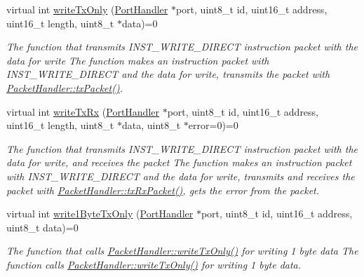 \begin{DoxyCompactItemize}
virtual int \hyperlink{classmercury_1_1_packet_handler_acf4e01987186250221603f794e7e4b59}{write\+Tx\+Only} (\hyperlink{classmercury_1_1_port_handler}{Port\+Handler} $\ast$port, uint8\+\_\+t id, uint16\+\_\+t address, uint16\+\_\+t length, uint8\+\_\+t $\ast$data)=0
\begin{DoxyCompactList}\small\item\em The function that transmits I\+N\+S\+T\+\_\+\+W\+R\+I\+T\+E\+\_\+\+D\+I\+R\+E\+CT instruction packet with the data for write  The function makes an instruction packet with I\+N\+S\+T\+\_\+\+W\+R\+I\+T\+E\+\_\+\+D\+I\+R\+E\+CT and the data for write,  transmits the packet with \hyperlink{classmercury_1_1_packet_handler_acc3f84f0d952dc2d827d8500de512abe}{Packet\+Handler\+::tx\+Packet()}. \end{DoxyCompactList}\item 
virtual int \hyperlink{classmercury_1_1_packet_handler_adf35a5000d465bd5426530e34a91a21d}{write\+Tx\+Rx} (\hyperlink{classmercury_1_1_port_handler}{Port\+Handler} $\ast$port, uint8\+\_\+t id, uint16\+\_\+t address, uint16\+\_\+t length, uint8\+\_\+t $\ast$data, uint8\+\_\+t $\ast$error=0)=0
\begin{DoxyCompactList}\small\item\em The function that transmits I\+N\+S\+T\+\_\+\+W\+R\+I\+T\+E\+\_\+\+D\+I\+R\+E\+CT instruction packet with the data for write, and receives the packet  The function makes an instruction packet with I\+N\+S\+T\+\_\+\+W\+R\+I\+T\+E\+\_\+\+D\+I\+R\+E\+CT and the data for write,  transmits and receives the packet with \hyperlink{classmercury_1_1_packet_handler_ac7ceeaec210827d119199144badaad3a}{Packet\+Handler\+::tx\+Rx\+Packet()},  gets the error from the packet. \end{DoxyCompactList}\item 
virtual int \hyperlink{classmercury_1_1_packet_handler_a21553798faa86c41203ab41a5c930938}{write1\+Byte\+Tx\+Only} (\hyperlink{classmercury_1_1_port_handler}{Port\+Handler} $\ast$port, uint8\+\_\+t id, uint16\+\_\+t address, uint8\+\_\+t data)=0
\begin{DoxyCompactList}\small\item\em The function that calls \hyperlink{classmercury_1_1_packet_handler_acf4e01987186250221603f794e7e4b59}{Packet\+Handler\+::write\+Tx\+Only()} for writing 1 byte data  The function calls \hyperlink{classmercury_1_1_packet_handler_acf4e01987186250221603f794e7e4b59}{Packet\+Handler\+::write\+Tx\+Only()} for writing 1 byte data. \end{DoxyCompactList}\item 

\end{DoxyCompactItemize}
